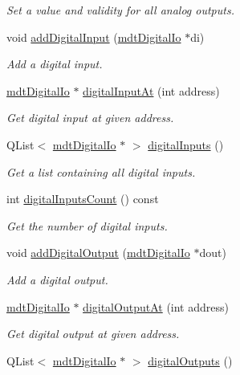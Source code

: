\begin{DoxyCompactItemize}
\begin{DoxyCompactList}\small\item\em Set a value and validity for all analog outputs. \end{DoxyCompactList}\item 
void \hyperlink{classmdt_device_ios_a023571f5d77bd0874c08b53890a56381}{addDigitalInput} (\hyperlink{classmdt_digital_io}{mdtDigitalIo} $\ast$di)
\begin{DoxyCompactList}\small\item\em Add a digital input. \end{DoxyCompactList}\item 
\hyperlink{classmdt_digital_io}{mdtDigitalIo} $\ast$ \hyperlink{classmdt_device_ios_a78f68d0efeac0a23628f133121f28df8}{digitalInputAt} (int address)
\begin{DoxyCompactList}\small\item\em Get digital input at given address. \end{DoxyCompactList}\item 
\hypertarget{classmdt_device_ios_ab70374d3ad06739f91388526d4203def}{
QList$<$ \hyperlink{classmdt_digital_io}{mdtDigitalIo} $\ast$ $>$ \hyperlink{classmdt_device_ios_ab70374d3ad06739f91388526d4203def}{digitalInputs} ()}
\label{classmdt_device_ios_ab70374d3ad06739f91388526d4203def}

\begin{DoxyCompactList}\small\item\em Get a list containing all digital inputs. \end{DoxyCompactList}\item 
\hypertarget{classmdt_device_ios_a8d6306c16a25c82d6d8002020f4dc16a}{
int \hyperlink{classmdt_device_ios_a8d6306c16a25c82d6d8002020f4dc16a}{digitalInputsCount} () const }
\label{classmdt_device_ios_a8d6306c16a25c82d6d8002020f4dc16a}

\begin{DoxyCompactList}\small\item\em Get the number of digital inputs. \end{DoxyCompactList}\item 
void \hyperlink{classmdt_device_ios_af1f41d3c60f1030fb303436820417d14}{addDigitalOutput} (\hyperlink{classmdt_digital_io}{mdtDigitalIo} $\ast$dout)
\begin{DoxyCompactList}\small\item\em Add a digital output. \end{DoxyCompactList}\item 
\hyperlink{classmdt_digital_io}{mdtDigitalIo} $\ast$ \hyperlink{classmdt_device_ios_ac2fed299f5ba1884c01adde195c5b007}{digitalOutputAt} (int address)
\begin{DoxyCompactList}\small\item\em Get digital output at given address. \end{DoxyCompactList}\item 
\hypertarget{classmdt_device_ios_a8a72f1844f794d4b5cb7bfede8bcef99}{
QList$<$ \hyperlink{classmdt_digital_io}{mdtDigitalIo} $\ast$ $>$ \hyperlink{classmdt_device_ios_a8a72f1844f794d4b5cb7bfede8bcef99}{digitalOutputs} ()}
\label{classmdt_device_ios_a8a72f1844f794d4b5cb7bfede8bcef99}


\end{DoxyCompactItemize}
